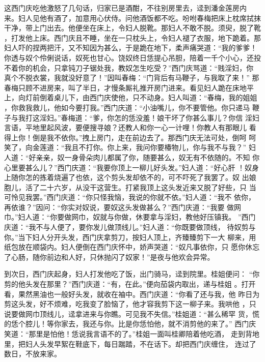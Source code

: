 这西门庆吃他激怒了几句话，归家已是酒酣，不往别房里去，迳到潘金莲房内
来。妇人见他有酒了，加意用心伏侍。问他酒饭都不吃。吩咐春梅把床上枕席拭抹
干净，带上门出去。他便坐在床上，令妇人脱靴。那妇人不敢不脱。须臾，脱了靴
，打发他上床。西门庆且不睡，坐在一只枕头上，令妇人褪了衣服，地下跪着。那
妇人吓的捏两把汗，又不知因为甚么，于是跪在地下，柔声痛哭道：“我的爹爹！
你透与奴个伶俐说话，奴死也甘心。饶奴终日恁提心吊胆，陪着一千个小心，还投
不着你的机会，只拿钝刀子锯处我，教奴怎生吃受？”西门庆骂道：“贱淫妇，你
真个不脱衣裳，我就没好意了！”因叫春梅：“门背后有马鞭子，与我取了来！”
那春梅只顾不进房来，叫了半日，才慢条厮礼推开房门进来。看见妇人跪在床地平
上，向灯前倒着桌儿下，由西门庆使他，只不动身。妇人叫道：“春梅，我的姐姐
，你救我救儿，他如今要打我。”西门庆道：“小油嘴儿，你不要管他。你只递马
鞭子与我打这淫妇。”春梅道：“爹，你怎的恁没羞！娘干坏了你甚么事儿？你信
淫妇言语，平地里起风波，要便搜寻娘？还教人和你一心一计哩！你教人有那眼儿
看得上你！倒是我不依你。”拽上房门，走在前边去了。那西门庆无法可处，倒呵
呵笑了，向金莲道：“我且不打你。你上来，我问你要椿物儿，你与我不与我？”
妇人道：“好亲亲，奴一身骨朵肉儿都属了你，随要甚么，奴无有不依随的。不知
你心里要甚么儿？”西门庆道：“我要你顶上一柳儿好头发。”妇人道：“好心肝
！奴身上随你怎的拣着烧遍了也依，这个剪头发却依不的，可不吓死了我罢了。奴
出娘胞儿，活了二十六岁，从没干这营生。打紧我顶上这头发近来又脱了好些，只
当可怜见我罢。”西门庆道：“你只怪我恼，我说的你就不依。”妇人道：“我不
依你，再依谁？”因问：“你实对奴说，要奴这头发做甚么？”西门庆道：“我要
做网巾。”妇人道：“你要做网巾，奴就与你做，休要拿与淫妇，教他好压镇我。
”西门庆道：“我不与人便了，要你发儿做顶线儿。”妇人道：“你既要做顶线，
待奴剪与你。”当下妇人分开头发，西门庆拿剪刀，按妇人顶上，齐臻臻剪下一大
柳来，用纸包放在顺袋内。妇人便倒在西门庆怀中，娇声哭道：“奴凡事依你，只
愿你休忘了心肠，随你前边和人好，只休抛闪了奴家！”是夜与他欢会异常。

到次日，西门庆起身，妇人打发他吃了饭，出门骑马，迳到院里。桂姐便问：
“你剪的他头发在那里？”西门庆道：“有，在此。”便向茄袋内取出，递与桂姐
。打开看，果然黑油也一般好头发，就收在袖中。西门庆道：“你看了还与我，他
昨日为剪这头发，好不烦难，吃我变了脸恼了，他才容我剪下这一柳子来。我哄他
，只说要做网巾顶线儿，迳拿进来与你瞧。可见我不失信。”桂姐道：“甚么稀罕
货，慌的恁个腔儿！等你家去，我还与你。比是你恁怕他，就不消剪他的来了。”
西门庆笑道：“那里是怕他！恁说我言语不的了。”桂姐一面叫桂卿陪着他吃酒，
走到背地里，把妇人头发早絮在鞋底下，每日踹踏，不在话下。却把西门庆缠住，
连过了数日，不放来家。

